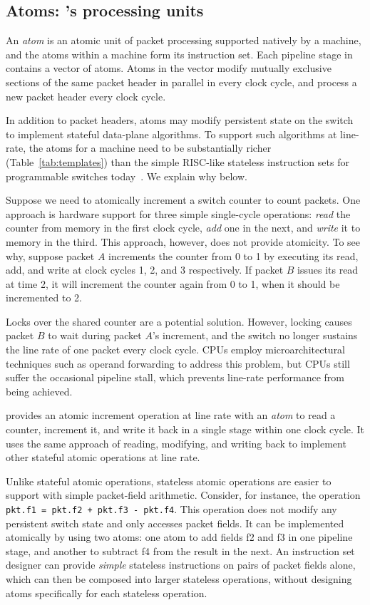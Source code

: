 \subsection{Atoms: \absmachine's processing units}
\label{ss:atoms}
 An {\em atom} is an atomic unit of packet processing supported natively by a
\absmachine machine, and the atoms within a \absmachine machine form its
instruction set. Each pipeline stage in \absmachine contains a vector of atoms.
Atoms in the vector modify mutually exclusive sections of the same packet
header in parallel in every clock cycle, and process a new packet header every
clock cycle.

In addition to packet headers, atoms may modify persistent state on the switch
to implement stateful data-plane algorithms. To support such algorithms at
line-rate, the atoms for a \absmachine machine need to be substantially richer
(Table~\ref{tab:templates}) than the simple RISC-like stateless instruction
sets for programmable switches today~\cite{rmt}. We explain why below.

Suppose we need to atomically increment a switch counter to count packets. One
approach is hardware support for three simple single-cycle operations:
\textit{read} the counter from memory in the first clock cycle, \textit{add}
one in the next, and \textit{write} it to memory in the third.  This approach,
however, does not provide atomicity. To see why, suppose packet $A$ increments
the counter from 0 to 1 by executing its read, add, and write at clock cycles
1, 2, and 3 respectively.  If packet $B$ issues its read at time 2, it will
increment the counter again from 0 to 1, when it should be incremented to 2.

Locks over the shared counter are a potential solution.  However, locking
causes packet $B$ to wait during packet $A$'s increment, and the switch no
longer sustains the line rate of one packet every clock cycle. CPUs employ
microarchitectural techniques such as operand forwarding to address this
problem, but CPUs still suffer the occasional pipeline stall, which prevents
line-rate performance from being achieved.

\absmachine provides an atomic increment operation at line rate with an {\em
atom} to read a counter, increment it, and write it back in a single stage within
one clock cycle. It uses the same approach of reading, modifying, and writing
back to implement other stateful atomic operations at line rate.

Unlike stateful atomic operations, stateless atomic operations are easier to
support with simple packet-field arithmetic.  Consider, for
instance, the operation {\tt pkt.f1 = pkt.f2 + pkt.f3 - pkt.f4}.  This
operation does not modify any persistent switch state and only accesses packet
fields. It can be implemented atomically by using two atoms: one atom to add
fields f2 and f3 in one pipeline stage, and another to subtract f4 from the
result in the next. An instruction set designer can provide {\em simple}
stateless instructions on pairs of packet fields alone, which can then be
composed into larger stateless operations, without designing atoms specifically
for each stateless operation.

